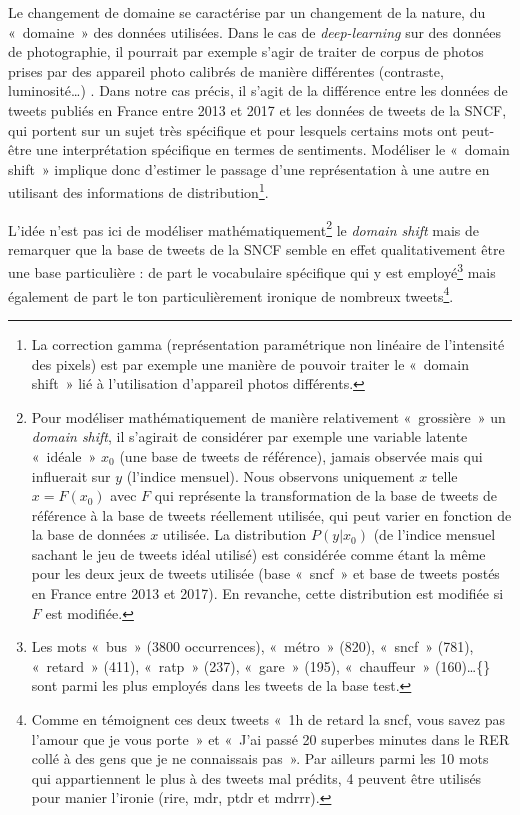 \documentclass[11pt,french,french]{article}
\let\rmarkdownfootnote\footnote%
\def\footnote{\protect\rmarkdownfootnote}
\begin{document}
Le changement de domaine se caractérise par un changement de la nature, du «~domaine~» des données utilisées.
Dans le cas de \emph{deep-learning} sur des données de photographie, il pourrait par exemple s'agir de traiter de corpus de photos prises par des appareil photo calibrés de manière différentes (contraste, luminosité\dots) .
Dans notre cas précis, il s'agit de la différence entre les données de tweets publiés en France entre 2013 et 2017 et les données de tweets de la SNCF, qui portent sur un sujet très spécifique et pour lesquels certains mots ont peut-être une interprétation spécifique en termes de sentiments.
Modéliser le «~domain shift~» implique donc d'estimer le passage d'une représentation à une autre en utilisant des informations de distribution\footnote{La correction gamma (représentation paramétrique non linéaire de l’intensité des pixels) est par exemple une manière de pouvoir traiter le « domain shift » lié à l’utilisation d’appareil photos différents.}.

L'idée n'est pas ici de modéliser mathématiquement\footnote{Pour modéliser mathématiquement de manière relativement «~grossière~» un \emph{domain shift}, il s'agirait de considérer par exemple une variable latente «~idéale~» \(x_0\) (une base de tweets de référence), jamais observée mais qui influerait sur \(y\) (l'indice mensuel).
  Nous observons uniquement \(x\) telle \(x=F(x_0)\) avec \(F\) qui représente la transformation de la base de tweets de référence à la base de tweets réellement utilisée, qui peut varier en fonction de la base de données \(x\) utilisée.
  La distribution \(P(y|x_0)\) (de l'indice mensuel sachant le jeu de tweets idéal utilisé) est considérée comme étant la même pour les deux jeux de tweets utilisée (base «~sncf~» et base de tweets postés en France entre 2013 et 2017).
  En revanche, cette distribution est modifiée si \(F\) est modifiée.} le \emph{domain shift} mais de remarquer que la base de tweets de la SNCF semble en effet qualitativement être une base particulière : de part le vocabulaire spécifique qui y est employé\footnote{Les mots «~bus~» (3800 occurrences), «~métro~» (820), «~sncf~» (781), «~retard~» (411), «~ratp~» (237), «~gare~» (195), «~chauffeur~» (160)\dots\{\} sont parmi les plus employés dans les tweets de la base test.} mais également de part le ton particulièrement ironique de nombreux tweets\footnote{Comme en témoignent ces deux tweets «~1h de retard la sncf, vous savez pas l'amour que je vous porte~» et «~J'ai passé 20 superbes minutes dans le RER collé à des gens que je ne connaissais pas~».
  Par ailleurs parmi les 10 mots qui appartiennent le plus à des tweets mal prédits, 4 peuvent être utilisés pour manier l'ironie (rire, mdr, ptdr et mdrrr).}.
\end{document}
